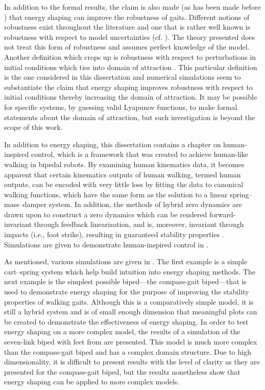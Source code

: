 In addition to the formal results, the claim is also made (as has been made
before \cite{Spong2003}) that energy shaping can improve the robustness of
gaits.
%
Different notions of robustness exist throughout the literature and one that is
rather well known is robustness with respect to model uncertainties
(cf. \cite{Freeman1996}).
%
The theory presented does not treat this form of robustness and assumes perfect
knowledge of the model.
%
Another definition which crops up is robustness with respect to perturbations in
initial conditions which ties into domain of attraction \cite{Chesi2011}.
%
This particular definition is the one considered in this dissertation and
numerical simulations seem to substantiate the claim that energy shaping
improves robustness with respect to initial conditions thereby increasing the
domain of attraction.
%
It may be possible for specific systems, by guessing valid Lyapunov functions,
to make formal statements about the domain of attraction, but such investigation
is beyond the scope of this work.

In addition to energy shaping, this dissertation contains a chapter on
human-inspired control, which is a framework that was created to achieve
human-like walking in bipedal robots.
%
By examining human kinematics data, it becomes apparent that certain
kinematics outputs of human walking, termed human outputs, can be encoded with
very little loss by fitting the data to canonical walking functions, which have
the same form as the solution to a linear spring--mass--damper system.
%
In addition, the methods of hybrid zero dynamics \cite{Morris2005} are drawn
upon to construct a zero dynamics which can be rendered forward-invariant
through feedback linearization, and is, moreover, invariant through impacts
(i.e., foot strike), resulting in guaranteed stability properties
\cite{Ames2012}.
%
Simulations are given to demonstrate human-inspired control in
.

As mentioned, various simulations are given in .
%
The first example is a simple cart--spring system which help build intuition
into energy shaping methods.
%
The next example is the simplest possible biped---the compass-gait
biped---that is used to demonstrate energy shaping for the purpose of improving
the stability properties of walking gaits.
%
Although this is a comparatively simple model, it is still a hybrid system and
is of small enough dimension that meaningful plots can be created to demonstrate
the effectiveness of energy shaping.
%
In order to test energy shaping on a more complex model, the results of a
simulation of the seven-link biped with feet from \cite{Grizzle2014} are
presented.
%
This model is much more complex than the compass-gait biped and has a complex
domain structure.
%
Due to high dimensionality, it is difficult to present results with the level of
clarity as they are presented for the compass-gait biped, but the results
nonetheless show that energy shaping can be applied to more complex models.
